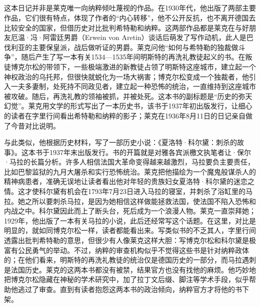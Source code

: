 \documentclass[UTF8]{ctexart}
\begin{document}
\subsection{}

这本日记并非是莱克唯一向纳粹倾吐蔑视的作品。在1930年代，他出版了两部主要作品，它们很有特点，体现了作者的“内心转移”，他不公开反抗，也不离开德国去比较安全的国家，但借历史对比批判希特勒和纳粹。这两部作品都是莱克在与好朋友厄温·冯·阿雷廷男爵（Erwein von Aretin）谈话后萌发了写作动机，此人是巴伐利亚的主要保皇派，战后做听证的男爵。莱克问他“如何与希特勒的独裁做斗争”，随后产生了写一本有关1534—1535年间明斯特的再洗礼教徒起义的书。在叛徒博克尔松的带领下，一些极端激进的新教徒占领了明斯特这座城市，建立起一个神权政治的乌托邦，但很快就蜕化为一场大祸害；博克尔松变成一个独裁者，他引入一夫多妻制，处死持不同政见者，建立起一种恐怖的统治，一直维持到这座城市被攻破。随后，再洗礼教的领袖被抓，并被处死。这本书的副标题是“历史的弥天幻觉”。莱克用文学的形式写出了一本历史书，该书于1937年初出版发行，让细心的读者在字里行间看出希特勒和纳粹的影子；莱克在1936年8月11日的日记亲自做了今昔对比说明。

与此类似，他根据历史材料，写了一部历史小说：《夏洛特·科尔黛：刺杀的故事》。这本书于1937年末出版发行。书的开篇就是对雅各宾派檄文执笔者让·保尔·马拉的长篇分析。许多人相信法国大革命变得越来越激烈，马拉要负主要责任，比如巴黎监狱的九月大屠杀和实行恐怖统治。莱克把他描绘为一个魔鬼般谋杀人的精神病患者，准确无误地让读者看出他对年轻的贵族妇女夏洛特·科尔黛的迷恋之情。这才使科尔黛有机会在1793年7月23日进入马拉的寝室，并刺杀了浴缸里的马拉。她之所以要刺杀马拉，是因为她相信这样做能拯救法国，使法国不陷入恐怖和内战之中。科尔黛因此而上了断头台，死后成为一个浪漫人物。莱克一直崇拜她；1929年，他出版了一本有关马拉的小说，此后还经常写这个话题。在这里，对比是明显的，就如同博克尔松一样，读者都能看出来。写类似书的不乏其人，字里行间透露出批判希特勒的意思，但很少有人像莱克这样大胆：写博克尔松和科尔黛是极富有公民勇气的举动。不过，纳粹的审查机构似乎不觉得这些书是针对纳粹政体的；在他们看来，明斯特的再洗礼教徒的统治仅是德国历史的一部分，而马拉遇刺是法国历史。莱克的这两本书都没有被禁，结果官方也没有找他的麻烦。他巧妙地把博克尔松隐藏在神秘的学术研究中，加了拉丁文后缀、脚注等学术手段，似乎帮助他逃过了审查。直到有读者抱怨这两本书的政治倾向，纳粹官方才将他的书下架。
\end{document}
